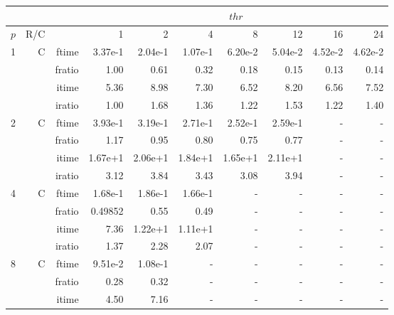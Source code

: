 \documentclass[a4paper]{article}
\begin{document}
\begin{table}[htbp]
\begin{center}
\begin{small}
\begin{tabular}{|r|r|r|r|r|r|r|r|r|r|}
\hline 
     & & & \multicolumn{7}{c|}{$thr$} \\ \hline
    $p$ & R/C &  & 1           & 2    & 4    & 8    & 12   & 16    & 24  \\ \hline\hline
   1 &   C &  ftime &    3.37e-1 &    2.04e-1 &    1.07e-1 &    6.20e-2 &    5.04e-2 &    4.52e-2 &    4.62e-2 \\
             &             &  fratio &    1.00 &   0.61 &   0.32 &    0.18 &    0.15 &    0.13 &    0.14 \\
             &             &  itime &    5.36  &    8.98  &    7.30  &    6.52  &    8.20  &    6.56  &    7.52  \\
             &             &  iratio &    1.00 &    1.68  &    1.36  &    1.22  &    1.53  &    1.22  &    1.40  \\\hline
   2 &  C &  ftime &    3.93e-1 &    3.19e-1 &    2.71e-1 &    2.52e-1 &    2.59e-1 &      - &      - \\
             &             &  fratio &   1.17  &    0.95 &    0.80 &    0.75 &    0.77 &      - &      - \\
             &             &  itime &    1.67e+1 &   2.06e+1 &   1.84e+1 &   1.65e+1 &   2.11e+1 &     - &      - \\
             &             &  iratio &    3.12  &    3.84  &    3.43  &    3.08  &    3.94  &      - &      - \\\hline
   4 &  C &  ftime &    1.68e-1 &    1.86e-1 &    1.66e-1 &      - &      - &      - &      - \\
             &             &  fratio &    0.49852 &    0.55 &    0.49 &      - &      - &      - &      - \\
             &             &  itime &    7.36  &    1.22e+1 &   1.11e+1 &     - &      - &      - &      - \\
             &             &  iratio &    1.37  &    2.28  &    2.07  &      - &      - &      - &      - \\\hline
   8 &   C &  ftime &    9.51e-2 &    1.08e-1 &      - &      - &      - &      - &      - \\
             &             &  fratio &    0.28 &    0.32 &      - &      - &      - &      - &      - \\
             &             &  itime &    4.50  &    7.16  &      - &      - &      - &      - &      - \\

\end{tabular}
\end{small}
\end{center}
\end{table}
\end{document}
